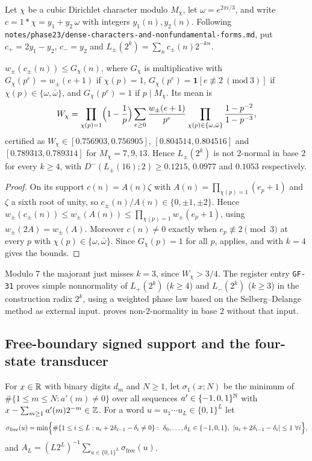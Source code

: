 \documentclass[11pt]{article}
\newcommand{\ttbreak}{\discretionary{}{}{}}
\newcommand{\ttt}[1]{\texttt{\begingroup\def\_{\textunderscore\ttbreak}#1\endgroup}}
\newcommand{\tpath}[1]{\nolinkurl{#1}}
\newcommand{\wpm}{w_{\pm}}
\newcommand{\sfree}{\sigma_{\mathrm{free}}}
\begin{document}
Let $\chi$ be a cubic Dirichlet character modulo $M_\chi$, let $\omega=e^{2\pi i/3}$, and write $c=1*\chi=y_1+y_2\,\omega$ with integers $y_1(n),y_2(n)$. Following \tpath{notes/phase23/dense-characters-and-nonfundamental-forms.md}, put $c_+=2y_1-y_2$, $c_-=y_2$ and $L_\pm(2^k)=\sum_nc_\pm(n)2^{-kn}$.

\begin{proposition}\label{prop:cubic}
$\wpm(c_\pm(n))\le G_\chi(n)$, where $G_\chi$ is multiplicative with $G_\chi(p^e)=\wpm(e+1)$ if $\chi(p)=1$, $G_\chi(p^e)=\mathbf 1[e\not\equiv2\ (\mathrm{mod}\ 3)]$ if $\chi(p)\in\{\omega,\bar\omega\}$, and $G_\chi(p^e)=1$ if $p\mid M_\chi$. Its mean is
\[
W_\chi=\prod_{\chi(p)=1}\Bigl(1-\frac1p\Bigr)\sum_{e\ge0}\frac{\wpm(e+1)}{p^e}\prod_{\chi(p)\in\{\omega,\bar\omega\}}\frac{1-p^{-2}}{1-p^{-3}},
\]
certified as $W_\chi\in[0.756903,0.756905]$, $[0.804514,0.804516]$ and $[0.789313,0.789314]$ for $M_\chi=7,9,13$. Hence $L_\pm(2^k)$ is not $2$-normal in base $2$ for every $k\ge4$, with $D^-(L_\pm(16);2)\ge0.1215$, $0.0977$ and $0.1053$ respectively.
\end{proposition}

\begin{proof}
On its support $c(n)=A(n)\zeta$ with $A(n)=\prod_{\chi(p)=1}(e_p+1)$ and $\zeta$ a sixth root of unity, so $c_\pm(n)/A(n)\in\{0,\pm1,\pm2\}$. Hence $\wpm(c_\pm(n))\le\wpm(A(n))\le\prod_{\chi(p)=1}\wpm(e_p+1)$, using $\wpm(2A)=\wpm(A)$. Moreover $c(n)\ne0$ exactly when $e_p\not\equiv2\pmod3$ at every $p$ with $\chi(p)\in\{\omega,\bar\omega\}$. Since $G_\chi(p)=1$ for all $p$,  applies, and  with $k=4$ gives the bounds.
\end{proof}

Modulo $7$ the majorant just misses $k=3$, since $W_\chi>3/4$. The register entry \ttt{GF-31} proves simple nonnormality of $L_+(2^k)$ ($k\ge4$) and $L_-(2^k)$ ($k\ge3$) in the construction radix $2^k$, using a weighted phase law based on the Selberg--Delange method \cite{Tenenbaum} as external input.  proves non-$2$-normality in base $2$ without that input.

\subsection{Free-boundary signed support and the four-state transducer}

\begin{definition}\label{def:sigma}
For $x\in\mathbb R$ with binary digits $d_m$ and $N\ge1$, let $\sigma_1(x;N)$ be the minimum of $\#\{1\le m\le N:a'(m)\ne0\}$ over all sequences $a'\in\{-1,0,1\}^{\mathbb N}$ with $x-\sum_{m\ge1}a'(m)2^{-m}\in\mathbb Z$. For a word $u=u_1\cdots u_L\in\{0,1\}^L$ let
\[
\sfree(u)=\min\Bigl\{\#\{1\le i\le L:u_i+2\delta_{i-1}-\delta_i\ne0\}:\ \delta_0,\dots,\delta_L\in\{-1,0,1\},\ |u_i+2\delta_{i-1}-\delta_i|\le1\ \forall i\Bigr\},
\]
and $A_L=(L2^L)^{-1}\sum_{u\in\{0,1\}^L}\sfree(u)$.
\end{definition}
\end{document}
